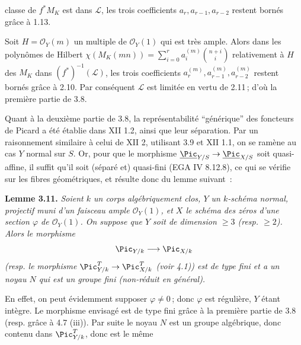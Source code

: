 classe de \(f^*M_K\) est dans \(\mathcal L\), les trois coefficients \(a_r,a_{r-1},a_{r-2}\) restent born\'es gr\^ace \`a 1.13.

Soit \(H=\mathcal O_Y(m)\) un multiple de \(\mathcal O_Y(1)\) qui est tr\`es ample. Alors dans les polyn\^omes de Hilbert \(\chi(M_K(mn))=\sum_{i=0}^{r}a_i^{(m)}\binom{n+i}{i}\) relativement \`a \(H\) des \(M_K\) dans \((f^*)^{-1}(\mathcal L)\), les trois coefficients \(a_r^{(m)},a_{r-1}^{(m)},a_{r-2}^{(m)}\) restent born\'es gr\^ace \`a 2.10. Par cons\'equent \(\mathcal L\) est limit\'ee en vertu de 2.11\,; d'o\`u la premi\`ere partie de 3.8.

Quant \`a la deuxi\`eme partie de 3.8, la repr\'esentabilit\'e ``g\'en\'erique'' des foncteurs de Picard a \'et\'e \'etablie dans XII 1.2, ainsi que leur s\'eparation. Par un raisonnement similaire \`a celui de XII 2, utilisant 3.9 et XII 1.1, on se ram\`ene au cas \(Y\) normal sur \(S\). Or, pour que le morphisme \(\underline{\Pic}_{Y/S}\to\underline{\Pic}_{X/S}\) soit quasi-affine, il suffit qu'il soit (s\'epar\'e et) quasi-fini (EGA IV 8.12.8), ce qui se v\'erifie sur les fibres g\'eom\'etriques, et r\'esulte donc du lemme suivant~:

\textbf{Lemme 3.11.} \emph{Soient \(k\) un corps alg\'ebriquement clos, \(Y\) un \(k\)-sch\'ema normal, projectif muni d'un faisceau ample \(\mathcal O_Y(1)\), et \(X\) le sch\'ema des z\'eros d'une section \(\varphi\) de \(\mathcal O_Y(1)\). On suppose que \(Y\) soit de dimension \(\ge3\) (resp. \(\ge2\)). Alors le morphisme}
\[
\Pic_{Y/k}\longrightarrow\Pic_{X/k}
\]
\emph{(resp. le morphisme \(\Pic^T_{Y/k}\to\Pic^T_{X/k}\) (voir 4.1)) est de type fini et a un noyau \(N\) qui est un groupe fini (non-r\'eduit en g\'en\'eral).}

En effet, on peut \'evidemment supposer \(\varphi\ne0\)\,; donc \(\varphi\) est r\'eguli\`ere, \(Y\) \'etant int\`egre. Le morphisme envisag\'e est de type fini gr\^ace \`a la premi\`ere partie de 3.8 (resp. gr\^ace \`a 4.7 (iii)). Par suite le noyau \(N\) est un groupe alg\'ebrique, donc contenu dans \(\Pic^T_{Y/k}\), donc est le m\^eme
